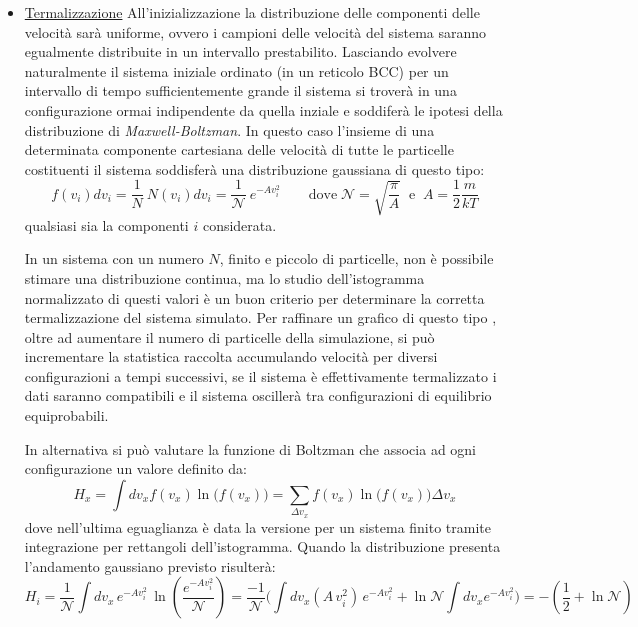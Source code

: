 \documentclass[11pt]{article}
\theoremstyle{plain}
\theoremstyle{remark}
\begin{document}
\begin{itemize}
\item \underline{Termalizzazione}\newline
All'inizializzazione la distribuzione delle componenti delle velocità sarà uniforme, ovvero i campioni delle velocità del sistema saranno egualmente distribuite in un intervallo prestabilito.
Lasciando evolvere naturalmente il sistema iniziale ordinato (in un reticolo BCC) per un intervallo di tempo sufficientemente grande il sistema si troverà in una configurazione ormai indipendente da quella inziale e soddiferà le ipotesi della distribuzione di \emph{Maxwell-Boltzman}.
In questo caso l'insieme di una determinata componente cartesiana delle velocità di tutte le particelle costituenti il sistema soddisferà una distribuzione gaussiana di questo tipo:
\begin{equation}
f(v_i) dv_i = \dfrac{1}{N} \: N(v_i) dv_i = \dfrac{1}{\mathcal{N}} \: e^{-A v_i^2} \qquad 
\textrm{dove} \; \mathcal{N} = \sqrt{\dfrac{\pi}{A}} \;\; \textrm{e} \;\; A = \dfrac{1}{2}\dfrac{m}{kT}
\end{equation}
qualsiasi sia la componenti $i$ considerata.


In un sistema con un numero $N$, finito e piccolo di particelle, non è possibile stimare una distribuzione continua, ma lo studio dell'istogramma normalizzato di questi valori è un buon criterio per determinare la corretta termalizzazione del sistema simulato. 
Per raffinare un grafico di questo tipo , oltre ad aumentare il numero di particelle della simulazione, si può incrementare la statistica raccolta accumulando velocità per diversi configurazioni a tempi successivi, se il sistema è effettivamente termalizzato i dati saranno compatibili e il sistema oscillerà tra configurazioni di equilibrio equiprobabili.

In alternativa si può valutare la funzione di Boltzman che associa ad ogni configurazione un valore definito da:
\begin{equation}
H_x = \int dv_x f(v_x) \ln{\biggr(f(v_x)\biggr)} = \sum_{\Delta v_x}^{}f(v_x) \ln{ \biggr(f(v_x)\biggr)} \Delta v_x
\end{equation} %
dove nell'ultima eguaglianza è data la versione per un sistema finito tramite integrazione per rettangoli dell'istogramma.
Quando la distribuzione presenta l'andamento gaussiano previsto risulterà:
\begin{equation}
H_i = \dfrac{1}{\mathcal{N}}\int dv_x \, e^{-A v_i^2} \, \ln{(\dfrac{e^{-A v_i^2}}{\mathcal{N}})} 
= \dfrac{-1}{\mathcal{N}} \Biggr( \int dv_x(A\, v_i^2)\, e^{-A v_i^2} + \ln{\mathcal{N}}\int dv_x e^{-A v_i^2}  \Biggr)
=- ( \dfrac{1}{2} + \ln{\mathcal{N}})
\end{equation}


\end{itemize}
\end{document}
